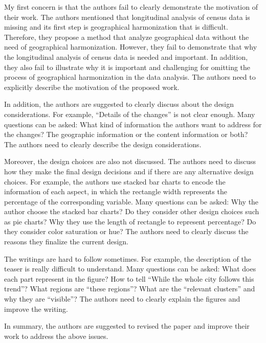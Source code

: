 \documentclass{article}
\begin{document}
\begin{itemize}
{    My first concern is that the authors fail to clearly demonstrate the motivation of
    their work. The authors mentioned that longitudinal analysis of census data is
    missing and its first step is geographical harmonization that is difficult.
    Therefore, they propose a method that analyze geographical data without the need
    of geographical harmonization. However, they fail to demonstrate that why the
    longitudinal analysis of census data is needed and important. In addition, they
    also fail to illustrate why it is important and challenging for omitting the
    process of geographical harmonization in the data analysis. The authors need to
    explicitly describe the motivation of the proposed work.

    In addition, the authors are suggested to clearly discuss about the design
    considerations. For example, “Details of the changes” is not clear enough. Many
    questions can be asked: What kind of information the authors want to address for
    the changes? The geographic information or the content information or both? The
    authors need to clearly describe the design considerations.

    Moreover, the design choices are also not discussed. The authors need to discuss
    how they make the final design decisions and if there are any alternative design
    choices. For example, the authors use stacked bar charts to encode the information
    of each aspect, in which the rectangle width represents the percentage of the
    corresponding variable. Many questions can be asked: Why the author choose the
    stacked bar charts? Do they consider other design choices such as pie charts? Why
    they use the length of rectangle to represent percentage? Do they consider color
    saturation or hue? The authors need to clearly discuss the reasons they finalize
    the current design.

    The writings are hard to follow sometimes. For example, the description of the
    teaser is really difficult to understand. Many questions can be asked: What does
    each part represent in the figure? How to tell “While the whole city follows this
    trend”? What regions are “these regions”? What are the “relevant clusters” and why
    they are “visible”? The authors need to clearly explain the figures and improve
    the writing.

    In summary, the authors are suggested to revised the paper and improve their work
    to address the above issues.
}
\end{itemize}
\end{document}
